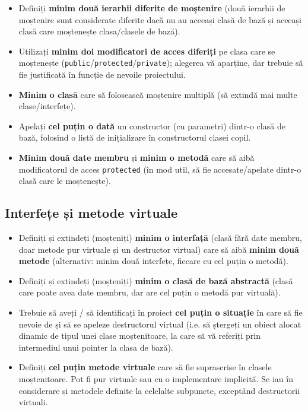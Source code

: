\begin{itemize}
    \item Definiți \textbf{minim două ierarhii diferite de moștenire} (două ierarhii de moștenire sunt considerate diferite dacă nu au aceeași clasă de bază și aceeași clasă care moștenește clasa/clasele de bază).

    \item Utilizați \textbf{minim doi modificatori de acces diferiți} pe clasa care se moștenește (\texttt{public}/\texttt{protected}/\texttt{private}); alegerea vă aparține, dar trebuie să fie justificată în funcție de nevoile proiectului.

    \item \textbf{Minim o clasă} care să folosească moștenire multiplă (să extindă mai multe clase/interfețe).

    \item Apelați \textbf{cel puțin o dată} un constructor (cu parametri) dintr-o clasă de bază, folosind o listă de inițializare în constructorul clasei copil.

    \item \textbf{Minim două date membru} și \textbf{minim o metodă} care să aibă modificatorul de acces \texttt{protected} (în mod util, să fie accesate/apelate dintr-o clasă care le moștenește).
\end{itemize}

\subsection*{Interfețe și metode virtuale}

\begin{itemize}
    \item Definiți și extindeți (moșteniți) \textbf{minim o interfață} (clasă fără date membru, doar metode pur virtuale și un destructor virtual) care să aibă \textbf{minim două metode} (alternativ: minim două interfețe, fiecare cu cel puțin o metodă).

    \item Definiți și extindeți (moșteniți) \textbf{minim o clasă de bază abstractă} (clasă care poate avea date membru, dar are cel puțin o metodă pur virtuală).

    \item Trebuie să aveți / să identificați în proiect \textbf{cel puțin o situație} în care să fie nevoie de și să se apeleze destructorul virtual (i.e. să ștergeți un obiect alocat dinamic de tipul unei clase moștenitoare, la care să vă referiți prin intermediul unui pointer la clasa de bază).

    \item Definiți \textbf{cel puțin   \fi metode virtuale} care să fie suprascrise în clasele moștenitoare. Pot fi pur virtuale sau cu o implementare implicită. Se iau în considerare și metodele definite la celelalte subpuncte, exceptând destructorii virtuali.
\end{itemize}


